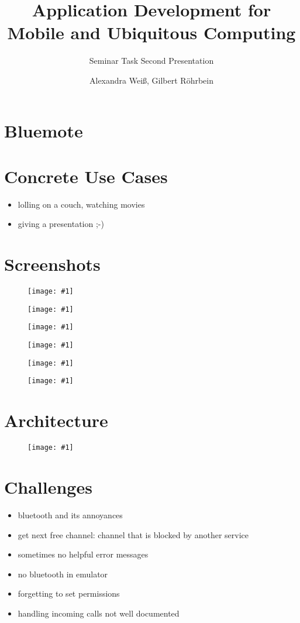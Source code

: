 \documentclass[ddc nogerman]{tudbeamer}
\newcommand{\imageframe}[1]{
    \begin{frame}
        \begin{figure}
            \centering
            \texttt{[image: \#1]}
        \end{figure}
    \end{frame}
}
\begin{document}

\title{Application Development for Mobile and Ubiquitous Computing}
\subtitle{Seminar Task Second Presentation}
\author{Alexandra Weiß, Gilbert Röhrbein}

\maketitle

\section{Bluemote}
\begin{frame}
\end{frame}

\section{Concrete Use Cases}
\begin{frame}
    \begin{itemize}
        \item lolling on a couch, watching movies
        \item giving a presentation ;-)
    \end{itemize}
\end{frame}

\section{Screenshots}
\imageframe{img/btactivate.png}
\imageframe{img/btauth.png}
\imageframe{img/choosedevice.png}
\imageframe{img/choosefunction.png}
\imageframe{img/presentation.png}
\imageframe{img/vlc.png}

\section{Architecture}
\imageframe{img/components.pdf}

\section{Challenges}
\begin{frame}
    \begin{itemize}
        \item bluetooth and its annoyances
    	\item get next free channel: channel that is blocked by another service
    	\item sometimes no helpful error messages
        \item no bluetooth in emulator
        \item forgetting to set permissions
        \item handling incoming calls not well documented
    \end{itemize}
\end{frame}
\end{document}

